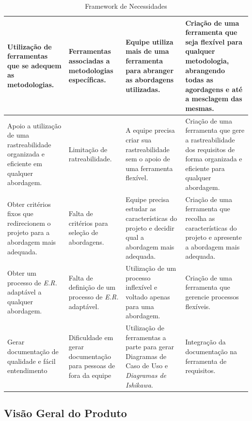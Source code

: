 \begin{table}[H]
\begin{tabular}{|p{5cm}|p{3cm}|p{3cm}|p{5cm}|}
Utilização de ferramentas que se adequem as metodologias. &
Ferramentas associadas a metodologias específicas. &
Equipe utiliza mais de uma ferramenta para abranger as abordagens utilizadas. &
Criação de uma ferramenta que seja flexível para qualquer metodologia, abrangendo todas as agordagens e até a mesclagem das mesmas.
\\ \hline
Apoio a utilização de uma rastreabilidade organizada e eficiente em qualquer abordagem. &
Limitação de ratreabilidade. &
A equipe precisa criar sua rastreabilidade sem o apoio de uma ferramenta flexível. &
Criação de uma ferramenta que gere a rastreabilidade dos requisitos de forma organizada e eficiente para qualquer abordagem.
\\ \hline
Obter critérios fixos que redirecionem o projeto para a abordagem mais adequada. &
Falta de critérios para seleção de abordagens. &
Equipe precisa estudar as características do projeto e decidir qual a abordagem mais adequada. &
Criação de uma ferramenta que recolha as características do projeto e apresente a abordagem mais adequada.
\\ \hline
Obter um processo de \textit{E.R.} adaptável a qualquer abordagem. &
Falta de definição de um processo de \textit{E.R.} adaptável. &
Utilização de um processo inflexível e voltado apenas para uma abordagem. &
Criação de uma ferramenta que gerencie processos flexíveis.
\\ \hline
Gerar documentação de qualidade e fácil entendimento &
Dificuldade em gerar documentação para pessoas de fora da equipe &
Utilização de ferramentas a parte para gerar Diagramas de Caso de Uso e \textit{Diagramas de Ishikawa}. &
Integração da documentação na ferramenta de requisitos.
\\ \hline
\end{tabular}
\caption{Framework de Necessidades}
\label{tab:frameworknecessidade}
\end{table}

\subsection{Visão Geral do Produto}
	
